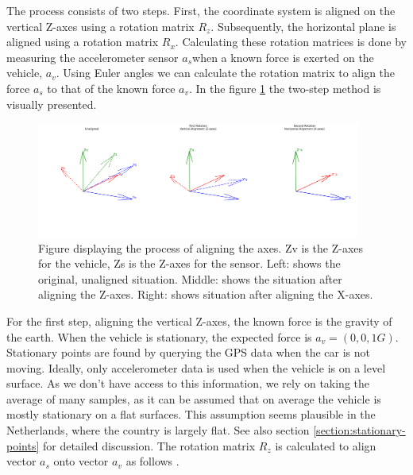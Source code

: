 The process consists of two steps. First, the coordinate system is aligned on the vertical Z-axes using a rotation matrix $R_z$. Subsequently, the horizontal plane is aligned using a rotation matrix $R_x$. Calculating these rotation matrices is done by measuring the accelerometer sensor $a_s$when a known force is exerted on the vehicle, $a_v$. Using Euler angles we can calculate the rotation matrix to align the force $a_s$ to that of the known force $a_v$. In the figure \ref{fig:align-vectors} the two-step method is visually presented.


\begin{figure}[H]
\begin{center}
\includegraphics[width=0.95\textwidth,keepaspectratio]{images/4_data/accelerometer-alignment.png}
\end{center}
\captionsetup{width=.95\textwidth}
\caption{Figure displaying the process of aligning the axes. Zv is the Z-axes for the vehicle, Zs is the Z-axes for the sensor. Left: shows the original, unaligned situation. Middle: shows the situation after aligning the Z-axes. Right: shows situation after aligning the X-axes.}
\label{fig:align-vectors}
\end{figure}



For the first step, aligning the vertical Z-axes, the known force is the gravity of the earth. When the vehicle is stationary, the expected force is $a_v = (0, 0, 1G)$. Stationary points are found by querying the GPS data when the car is not moving. Ideally, only accelerometer data is used when the vehicle is on a level surface. As we don't have access to this information, we rely on taking the average of many samples, as it can be assumed that on average the vehicle is mostly stationary on a flat surfaces. This assumption seems plausible in the Netherlands, where the country is largely flat. See also section \ref{section:stationary-points} for detailed discussion. The rotation matrix $R_z$ is calculated to align vector $a_s$ onto vector $a_v$ as follows \cite{rotation_matrix}. 

